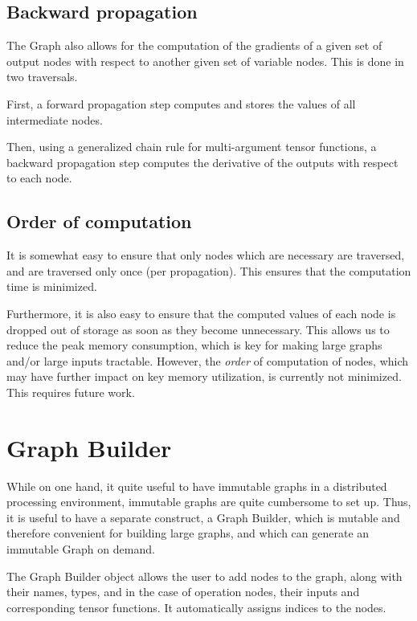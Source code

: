 \documentclass{article}
\begin{document}
  \subsection{Backward propagation}
    The Graph also allows for the computation of the gradients
    of a given set of output nodes with respect to another given set
    of variable nodes.
    This is done in two traversals.
    
    First, a forward propagation step computes and stores
    the values of all intermediate nodes.
    
    Then, using a generalized chain rule for multi-argument tensor functions,
    a backward propagation step computes the derivative of the outputs
    with respect to each node.
    
  \subsection{Order of computation}
    It is somewhat easy to ensure that only nodes which are necessary
    are traversed, and are traversed only once (per propagation).
    This ensures that the computation time is minimized.
    
    Furthermore, it is also easy to ensure that the computed values 
    of each node is dropped out of storage as soon as they become unnecessary.
    This allows us to reduce the peak memory consumption,
    which is key for making large graphs and/or large inputs tractable.
    However, the \emph{order} of computation of nodes, 
    which may have further impact on key memory utilization, 
    is currently not minimized. This requires future work.
  
\section{Graph Builder}
  While on one hand, it quite useful to have immutable graphs
  in a distributed processing environment, immutable graphs are quite 
  cumbersome to set up.
  Thus, it is useful to have a separate construct, a Graph Builder,
  which is mutable and therefore convenient for building large graphs,
  and which can generate an immutable Graph on demand.
  
  The Graph Builder object allows the user to add nodes to the graph,
  along with their names, types, and in the case of operation nodes,
  their inputs and corresponding tensor functions.
  It automatically assigns indices to the nodes.
  
\end{document}
